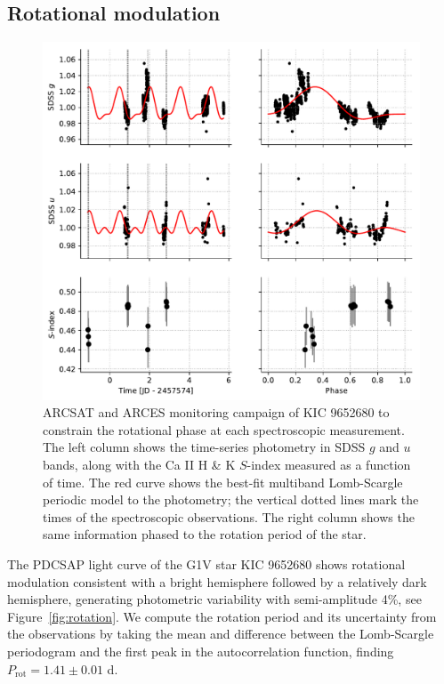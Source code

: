 \subsection{Rotational modulation}

\begin{figure}
    \centering
    \includegraphics[scale=0.9]{nephelion/arcsat.pdf}
    \caption{ARCSAT and ARCES monitoring campaign of KIC 9652680 to constrain the rotational phase at each spectroscopic measurement. The left column shows the time-series photometry in SDSS $g$ and $u$ bands, along with the Ca II H \& K $S$-index measured as a function of time. The red curve shows the best-fit multiband Lomb-Scargle periodic model to the photometry; the vertical dotted lines mark the times of the spectroscopic observations. The right column shows the same information phased to the rotation period of the star.}
    \label{fig:arcsat}
\end{figure}

The \kepler PDCSAP light curve of the G1V star KIC 9652680 shows rotational modulation consistent with a bright hemisphere followed by a relatively dark hemisphere, generating photometric variability with semi-amplitude 4\%, see Figure~\ref{fig:rotation}. We compute the rotation period and its uncertainty from the \kepler observations by taking the mean and difference between the Lomb-Scargle periodogram and the first peak in the autocorrelation function, finding $P_\mathrm{rot} = 1.41 \pm 0.01$ d.

